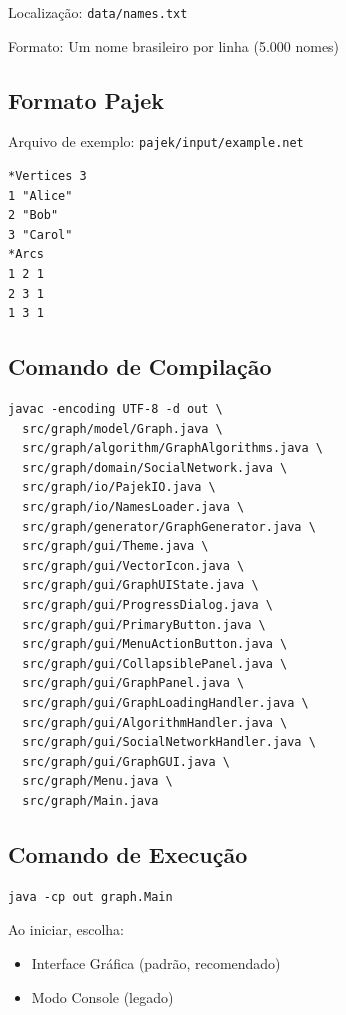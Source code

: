 \documentclass[12pt,a4paper]{article}
\begin{document}
Localização: \texttt{data/names.txt}

Formato: Um nome brasileiro por linha (5.000 nomes)

\subsection{Formato Pajek}

Arquivo de exemplo: \texttt{pajek/input/example.net}

\begin{verbatim}
*Vertices 3
1 "Alice"
2 "Bob"
3 "Carol"
*Arcs
1 2 1
2 3 1
1 3 1
\end{verbatim}

\subsection{Comando de Compilação}

\begin{verbatim}
javac -encoding UTF-8 -d out \
  src/graph/model/Graph.java \
  src/graph/algorithm/GraphAlgorithms.java \
  src/graph/domain/SocialNetwork.java \
  src/graph/io/PajekIO.java \
  src/graph/io/NamesLoader.java \
  src/graph/generator/GraphGenerator.java \
  src/graph/gui/Theme.java \
  src/graph/gui/VectorIcon.java \
  src/graph/gui/GraphUIState.java \
  src/graph/gui/ProgressDialog.java \
  src/graph/gui/PrimaryButton.java \
  src/graph/gui/MenuActionButton.java \
  src/graph/gui/CollapsiblePanel.java \
  src/graph/gui/GraphPanel.java \
  src/graph/gui/GraphLoadingHandler.java \
  src/graph/gui/AlgorithmHandler.java \
  src/graph/gui/SocialNetworkHandler.java \
  src/graph/gui/GraphGUI.java \
  src/graph/Menu.java \
  src/graph/Main.java
\end{verbatim}

\subsection{Comando de Execução}

\begin{verbatim}
java -cp out graph.Main
\end{verbatim}

Ao iniciar, escolha:
\begin{itemize}
    \item [1] Interface Gráfica (padrão, recomendado)
    \item [2] Modo Console (legado)
\end{itemize}
\end{document}
